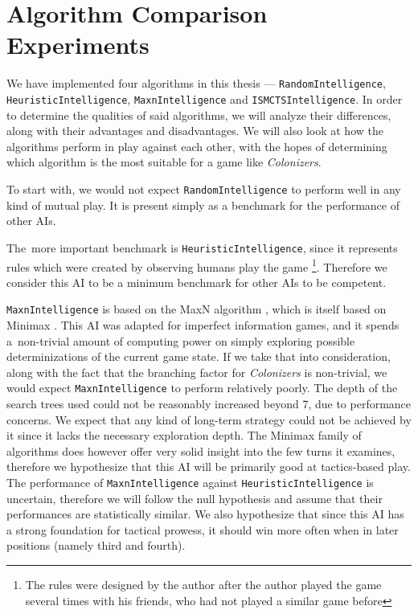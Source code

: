 \section{Algorithm Comparison Experiments}

We have implemented four algorithms in this thesis --- \texttt{RandomIntelligence},
\texttt{HeuristicIntelligence}, \texttt{MaxnIntelligence} and \texttt{ISMCTSIntelligence}.
In order to determine the qualities of said algorithms, we will analyze their differences,
along with their advantages and disadvantages. We will also look at how the algorithms
perform in play against each other, with the hopes of determining which algorithm
is the most suitable for a game like \emph{Colonizers}.

To start with, we would not expect \texttt{RandomIntelligence} to perform well in any
kind of mutual play. It is present simply as a benchmark for the performance of
other AIs.

The~more important benchmark is \texttt{HeuristicIntelligence}, since it represents
rules which were created by observing humans play the game
\footnote{The rules were designed by the author after the author played the game
several times with his friends, who had not played a similar game before}.
Therefore we consider this
AI to be a minimum benchmark for other AIs to be competent.

\texttt{MaxnIntelligence} is based on the MaxN algorithm \cite{Luckhardt86}, which
is itself based on Minimax \cite{Millington09}. This AI was adapted for imperfect
information games, and it spends a~non-trivial amount of computing power
on simply exploring possible determinizations of the current game state.
If we take that into consideration, along with the fact that the branching factor
for \emph{Colonizers} is non-trivial, we would expect \texttt{MaxnIntelligence}
to perform relatively poorly. The depth of the search trees used could not be
reasonably increased beyond 7, due to performance concerns. We expect that any kind of
long-term strategy could not be achieved by it since it lacks the necessary
exploration depth. The Minimax family of algorithms does however offer very
solid insight into the few turns it examines, therefore we hypothesize that this AI will be
primarily good at tactics-based play. The performance of \texttt{MaxnIntelligence}
against \texttt{HeuristicIntelligence} is uncertain, therefore we will follow the null
hypothesis and assume that their performances are statistically similar.
We also hypothesize that since this AI has a strong foundation for tactical prowess,
it should win more often when in later positions (namely third and fourth).

